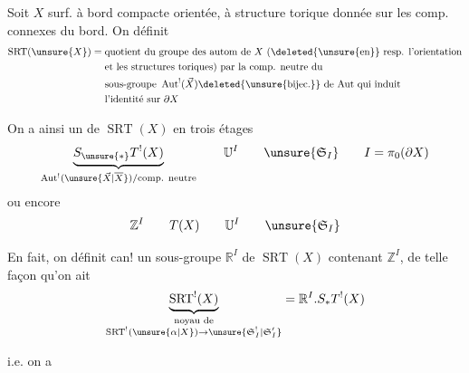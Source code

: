 

Soit $X$ surf. à bord compacte orientée, à structure torique
donnée sur les comp. connexes du bord.
On définit
\[
\begin{aligned}
\operatorname{SRT}(\unsure{X})={}&
\text{quotient du groupe des autom de }X
\text{ (\deleted{\unsure{en}} resp. l'orientation}\\
&\text{et les structures toriques) par la comp. neutre du}\\
&\text{sous-groupe }\operatorname{Aut}^!(\vec X)
\deleted{\unsure{\mathrm{bijec.}}}
\text{ de Aut qui induit}\\
&\text{l'identité sur }\partial X
\end{aligned}
\]

On a ainsi un  de $\operatorname{SRT}(X)$ en trois étages
\[
\underbrace{S_{\unsure{*}}T^!(X)}_{
\operatorname{Aut}^!(\unsure{\vec X|\overline X})/
\text{comp. neutre}}
\qquad\mathbb U^I\qquad\unsure{\mathfrak S_I}
\qquad I=\pi_0(\partial X)
\]
ou encore
\[
\mathbb Z^I\qquad T(X)\qquad\mathbb U^I\qquad\unsure{\mathfrak S_I}
\]

En fait, on définit can! un sous-groupe 
$\mathbb R^I$ de $\operatorname{SRT}(X)$
contenant $\mathbb Z^I$, de telle façon qu'on ait
\[
\underbrace{\operatorname{SRT}^!(X)}_{
\substack{\text{noyau de}\\
\operatorname{SRT}^!(\unsure{\alpha|X})\to\unsure{\mathfrak S_I^!|\mathfrak S_I'}}}
=\mathbb R^I.S_*T^!(X)
\]


i.e. on a



